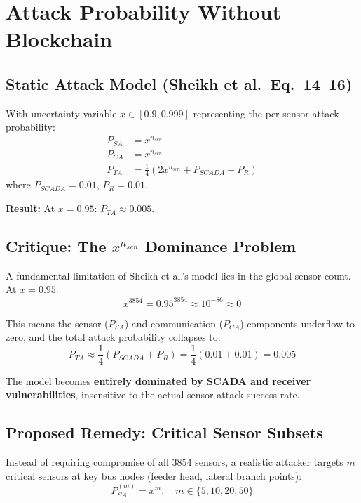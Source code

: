 \documentclass[10pt,twocolumn,letterpaper]{article}
\begin{document}
\section{Attack Probability Without Blockchain}
\label{sec:without}

\subsection{Static Attack Model (Sheikh et al.\ Eq.~14--16)}

With uncertainty variable $x \in [0.9, 0.999]$ representing the per-sensor attack probability:
\begin{align}
P_{SA} &= x^{n_{sen}} \tag{Eq.~14} \\
P_{CA} &= x^{n_{sen}} \tag{Eq.~15} \\
P_{TA} &= \frac{1}{4}\left(2x^{n_{sen}} + P_{SCADA} + P_R\right) \tag{Eq.~16}
\end{align}
where $P_{SCADA} = 0.01$, $P_R = 0.01$.

\textbf{Result:} At $x = 0.95$: $P_{TA} \approx 0.005$.

\subsection{Critique: The $x^{n_{sen}}$ Dominance Problem}
\label{sec:dominance}

A fundamental limitation of Sheikh et al.'s model lies in the global sensor count. At $x = 0.95$:
\begin{equation}
x^{3854} = 0.95^{3854} \approx 10^{-86} \approx 0
\end{equation}

This means the sensor ($P_{SA}$) and communication ($P_{CA}$) components underflow to zero, and the total attack probability collapses to:
\begin{equation}
P_{TA} \approx \frac{1}{4}(P_{SCADA} + P_R) = \frac{1}{4}(0.01 + 0.01) = 0.005
\end{equation}

The model becomes \textbf{entirely dominated by SCADA and receiver vulnerabilities}, insensitive to the actual sensor attack success rate.

\subsection{Proposed Remedy: Critical Sensor Subsets}

Instead of requiring compromise of all 3854 sensors, a realistic attacker targets $m$ critical sensors at key bus nodes (feeder head, lateral branch points):
\begin{equation}
P_{SA}^{(m)} = x^m, \quad m \in \{5, 10, 20, 50\}
\end{equation}
\end{document}

